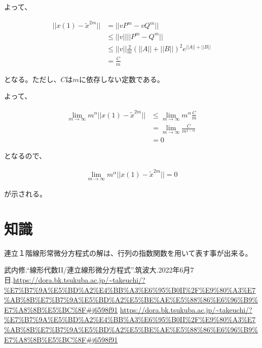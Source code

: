 \documentclass[a4paper, 10pt, dvipdfmx]{jlreq}
\begin{document}
よって、

\begin{align*}
    ||x(1)-\tilde{x}^{2m}|| & =||vP^m-vQ^m||                                                   \\
                            & \leq ||v||||P^m-Q^m||                                            \\
                            & \leq ||v||\frac{2}{m} \left(||A||+||B||\right)^2 e^{||A||+||B||} \\
                            & =\frac{C}{m}
\end{align*}

となる。ただし、$C$は$m$に依存しない定数である。

よって、

\begin{align*}
    \lim_{m \to \infty} m^\alpha ||x(1)-\tilde{x}^{2m}|| & \leq \lim_{m \to \infty} {m^\alpha \frac{C}{m}} \\
                                                         & =\lim_{m \to \infty} \frac{C}{m^{1-\alpha}}     \\
                                                         & =0
\end{align*}

となるので、

\begin{align*}
    \lim_{m \to \infty} m^\alpha ||x(1)-\tilde{x}^{2m}||=0
\end{align*}

が示される。

\section{知識}

連立１階線形常微分方程式の解は、行列の指数関数を用いて表す事が出来る。


\begin{thebibliography}{9}
    武内修.“線形代数II/連立線形微分方程式”.筑波大.2022年6月7日.\url{https://dora.bk.tsukuba.ac.jp/~takeuchi/?%E7%B7%9A%E5%BD%A2%E4%BB%A3%E6%95%B0II%2F%E9%80%A3%E7%AB%8B%E7%B7%9A%E5%BD%A2%E5%BE%AE%E5%88%86%E6%96%B9%E7%A8%8B%E5%BC%8F#j6598f91}
    \url{https://dora.bk.tsukuba.ac.jp/~takeuchi/?%E7%B7%9A%E5%BD%A2%E4%BB%A3%E6%95%B0II%2F%E9%80%A3%E7%AB%8B%E7%B7%9A%E5%BD%A2%E5%BE%AE%E5%88%86%E6%96%B9%E7%A8%8B%E5%BC%8F#j6598f91}
\end{thebibliography}
\end{document}
